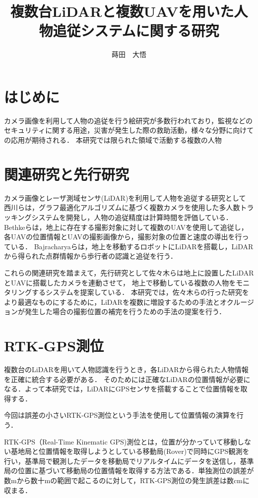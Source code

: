 \documentclass[autodetect-engine,dvipdfmx-if-dvi,ja=standard,a4j,jbase=10.5pt,twoside,twocolumn,magstyle=nomag*]{bxjsarticle}
\title{複数台LiDARと複数UAVを用いた人物追従システムに関する研究}
\author{蒔田　大悟}
\date{}
\begin{document}
\maketitle

\section{はじめに} \label{sec:intro}
カメラ画像を利用して人物の追従を行う絵研究が多数行われており，監視などのセキュリティに関する用途，災害が発生した際の救助活動，様々な分野に向けての応用が期待される．
本研究では限られた領域で活動する複数の人物%

\section{関連研究と先行研究} 
カメラ画像とレーザ測域センサ(LiDAR)を利用して人物を追従する研究として
西川らは，グラフ最適化アルゴリズムに基づく複数カメラを使用した多人数トラッキングシステムを開発し，人物の追従精度は計算時間を評価している．
Bethkeらは，地上に存在する撮影対象に対して複数のUAVを使用して追従し，各UAVの位置情報とUAVの撮影画像から，撮影対象の位置と速度の導出を行っている．\cite{bethke_2007}
Bajracharyaらは，地上を移動するロボットにLiDARを搭載し，LiDARから得られた点群情報から歩行者の認識と追従を行う．\cite{bajracharya_2009}

これらの関連研究を踏まえて，先行研究として佐々木らは地上に設置したLiDARとUAVに搭載したカメラを連動させて，
地上で移動している複数の人物をモニタリングするシステムを提案している．\cite{sasaki_2019}
本研究では，佐々木らの行った研究をより最適なものにするために，LiDARを複数に増設するための手法とオクルージョンが発生した場合の撮影位置の補完を行うための手法の提案を行う．


\section{RTK‐GPS測位}
複数台のLiDARを用いて人物認識を行うとき，各LiDARから得られた人物情報を正確に統合する必要がある．
そのためには正確なLiDARの位置情報が必要になる．よって本研究では，LiDARにGPSセンサを搭載することで位置情報を取得する．

今回は誤差の小さいRTK-GPS測位という手法を使用して位置情報の演算を行う．

RTK‐GPS（Real-Time Kinematic GPS)測位とは，位置が分かっていて移動しない基地局と位置情報を取得しようとしている移動局(Rover)で同時にGPS観測を行い，基準局で観測したデータを移動局でリアルタイムにデータを送信し，基準局の位置に基づいて移動局の位置情報を取得する方法である．単独測位の誤差が数mから数十mの範囲で起こるのに対して，RTK‐GPS測位の発生誤差は数cmに収まる．
\end{document}
